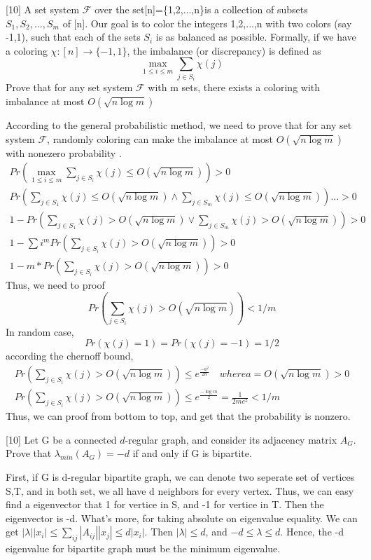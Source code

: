 \documentclass[addpoints]{exam}
\begin{document}
\begin{questions}
[10]
A set system $\mathcal{F}$ over the set[n]=\{1,2,...,n\}is a collection of subsets $S_1,S_2,...,S_m$ of [n]. Our goal is to color the integers {1,2,...,n} with two colors (say -1,1), such that each of the sets $S_i$ is as balanced as possible. Formally, if we have a coloring $ \chi:[n] \rightarrow \{-1,1\}$, the imbalance (or discrepancy) is defined as
\[ \max_{1 \leq i \leq m} \sum_{j \in S_i} \chi(j)\]
Prove that for any set system $\mathcal{F}$ with m sets, there exists a coloring with imbalance at most $O(\sqrt{n\log m})$
\begin{solution}
According to the general probabilistic method, we need to prove that for any set system $\mathcal{F}$, randomly coloring can make the imbalance at most $O(\sqrt{n\log m})$ with nonezero probability .\\
\begin{align*}
Pr(\max_{1 \leq i \leq m} \sum_{j \in S_i} \chi(j) \leq O(\sqrt{n\log m}) ) > 0 \\
Pr(\sum_{j \in S_1} \chi(j) \leq O(\sqrt{n\log m}) \wedge \sum_{j \in S_m} \chi(j) \leq O(\sqrt{n\log m}) ) ...  >0 \\
1 -  Pr(\sum_{j \in S_1} \chi(j) > O(\sqrt{n\log m}) \vee \sum_{j \in S_m} \chi(j) > O(\sqrt{n\log m}) ) > 0 \\
1 -  \sum{i}^{m}Pr(\sum_{j \in S_i} \chi(j) > O(\sqrt{n\log m})) > 0 \\
1- m *  Pr(\sum_{j \in S_i} \chi(j) > O(\sqrt{n\log m})) >0
\end{align*}
Thus, we need to proof 
\[Pr(\sum_{j \in S_i} \chi(j) > O(\sqrt{n\log m})) < 1/m \]
In random case, \[Pr(\chi(j) = 1) = Pr(\chi(j) = -1) = 1/2\]
according the chernoff bound, 
\begin{align*}
Pr(\sum_{j \in S_i} \chi(j)> O(\sqrt{n\log m})) \leq e^{\frac{-a^2}{2n}} \quad where a = O(\sqrt{n\log m}) >0 \\
Pr(\sum_{j \in S_i} \chi(j) > O(\sqrt{n\log m})) \leq e^{\frac{-\log m}{2}} = \frac{1}{2me^2}< 1/m
\end{align*}
Thus, we can proof from bottom to top, and get that the probability is nonzero. 
\end{solution}

[10]
Let G be a connected $d$-regular graph, and consider its adjacency matrix $A_G$.
Prove that $\lambda _{min}(A_G) = -d$ if and only if G is bipartite.

\begin{solution}
  First, if G is d-regular bipartite graph,  we can denote two seperate set of vertices  S,T, and in both set, we all have d neighbors for every vertex. Thus, we can easy find a eigenvector that 1 for vertice in S, and -1 for vertice in T.  Then the eigenvector is -d. What's more,  for taking absolute on eigenvalue equality. We can get 
 $|\lambda||x_i| \leq \sum_{ij}|A_{ij}||x_j| \leq d|x_i|$.
 Then $|\lambda| \leq d$,  and $-d \leq \lambda \leq d$. Hence, the -d eigenvalue for bipartite graph must be the minimum eigenvalue.
 

\end{solution}
\end{questions}
\end{document}
